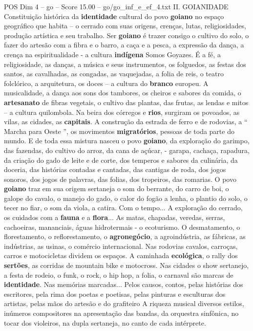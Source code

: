 \begin{textsample}{POS Dim 4 – go – Score 15.00 – go/go\_inf\_e\_ef\_4.txt}  \label{ex:f4_pos_065}
II.
GOIANIDADE Constituição histórica da \textbf{identidade} cultural do povo \textbf{goiano} no espaço geográfico que habita – o cerrado com suas origens, crenças, lutas, religiosidades, produção artística e seu trabalho.
Ser \textbf{goiano} é trazer consigo o cultivo do solo, o fazer do artesão com a fibra e o barro, a caça e a pesca, a expressão da dança, a crença na espiritualidade - a cultura \textbf{indígena} Somos Goyazes.
É a fé, a religiosidade, as danças, a música e seus instrumentos, os folguedos, as festas dos santos, as cavalhadas, as congadas, as vaquejadas, a folia de reis, o teatro folclórico, a arquitetura, os doces – a cultura do \textbf{branco} europeu.
A musicalidade, a dança aos sons dos tambores, os cheiros e sabores da comida, o \textbf{artesanato} de fibras vegetais, o cultivo das plantas, das frutas, as lendas e mitos – a cultura quilombola.
Na beira dos córregos e \textbf{rios}, surgiram os povoados, as vilas, as cidades, as \textbf{capitais}.
A construção da estrada de ferro e de rodovias, a “ Marcha para Oeste ”, os movimentos \textbf{migratórios}, pessoas de toda parte do mundo.
E de toda essa mistura nasceu o povo \textbf{goiano}, da exploração do garimpo, das fazendas, do cultivo do arroz, da cana de açúcar, - garapa, cachaça, rapadura, da criação do gado de leite e de corte, dos temperos e sabores da culinária, da doceria, das histórias contadas e cantadas, das cantigas de roda, dos jogos sonoros, dos jogos de palavras, das folias, dos tropeiros, das romarias.
O povo \textbf{goiano} traz em sua origem sertaneja o som do berrante, do carro de boi, o galope do cavalo, o manejo do gado, o calor do fogão a lenha, o plantio do solo, o tecer no fiar, o som da viola, a catira.
Com o tempo...
A exploração do cerrado, os cuidados com a \textbf{fauna} e a \textbf{flora}...
As matas, chapadas, veredas, serras, cachoeiras, mananciais, águas hidrotermais - o ecoturismo.
O desmatamento, o florestamento, o reflorestamento, o \textbf{agronegócio}, a agroindústria, as fábricas, as indústrias, as usinas, o comércio internacional.
Nas rodovias cavalos, carroças, carros e motocicletas dividem os espaços.
A caminhada \textbf{ecológica}, o rally dos \textbf{sertões}, as corridas de mountain bike e motocross.
Nas cidades o show sertanejo, a festa de rodeio, o funk, o rock, o hip hop, a folia, o carnaval são marcas de \textbf{identidade}.
Nas memórias marcadas...
Pelos causos, contos, pelas histórias dos escritores, pela rima dos poetas e poetisas, pelas pinturas e esculturas dos artistas, pelas mãos do artesão e do grafiteiro A riqueza musical diversos estilos, inúmeros compositores na apresentação das bandas, da orquestra sinfônica, no tocar dos violeiros, na dupla sertaneja, no canto de cada intérprete.

\end{textsample}
